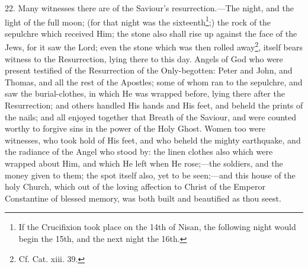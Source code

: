22. Many witnesses there are of the Saviour’s resurrection.—The night, and the light of the full moon; (for that night was the sixteenth\footnote{If the Crucifixion took place on the 14th of Nisan, the following night would begin the 15th, and the next night the 16th.};) the rock of the sepulchre which received Him; the stone also shall rise up against the face of the Jews, for it saw the Lord; even the stone which was then rolled away\footnote{Cf. Cat. xiii. 39.}, itself bears witness to the Resurrection, lying there to this day. Angels of God who were present testified of the Resurrection of the Only-begotten: Peter and John, and Thomas, and all the rest of the Apostles; some of whom ran to the sepulchre, and saw the burial-clothes, in which He was wrapped before, lying there after the Resurrection; and others handled His hands and His feet, and beheld the prints of the nails; and all enjoyed together that Breath of the Saviour, and were counted worthy to forgive sins in the power of the Holy Ghost. Women too were witnesses, who took hold of His feet, and who beheld the mighty earthquake, and the radiance of the Angel who stood by: the linen clothes also which were wrapped about Him, and which He left when He rose;—the soldiers, and the money given to them; the spot itself also, yet to be seen;—and this house of the holy Church, which out of the loving affection to Christ of the Emperor Constantine of blessed memory, was both built and beautified as thou seest.


